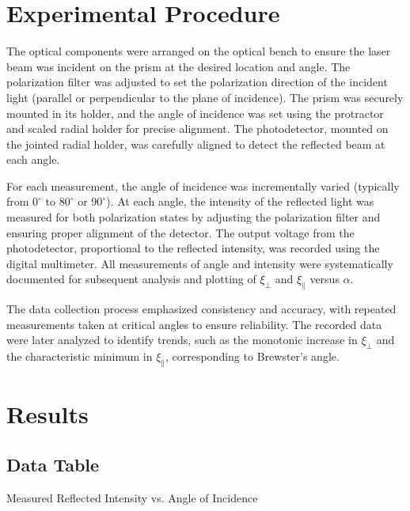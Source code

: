 \documentclass[journal]{IEEEtran}
\begin{document}
\section{Experimental Procedure}
The optical components were arranged on the optical bench to ensure the laser beam was incident on the prism at the desired location and angle. The polarization filter was adjusted to set the polarization direction of the incident light (parallel or perpendicular to the plane of incidence). The prism was securely mounted in its holder, and the angle of incidence was set using the protractor and scaled radial holder for precise alignment. The photodetector, mounted on the jointed radial holder, was carefully aligned to detect the reflected beam at each angle.

For each measurement, the angle of incidence was incrementally varied (typically from $0^\circ$ to $80^\circ$ or $90^\circ$). At each angle, the intensity of the reflected light was measured for both polarization states by adjusting the polarization filter and ensuring proper alignment of the detector. The output voltage from the photodetector, proportional to the reflected intensity, was recorded using the digital multimeter. All measurements of angle and intensity were systematically documented for subsequent analysis and plotting of $\xi_{\perp}$ and $\xi_{\parallel}$ versus $\alpha$.

The data collection process emphasized consistency and accuracy, with repeated measurements taken at critical angles to ensure reliability. The recorded data were later analyzed to identify trends, such as the monotonic increase in $\xi_{\perp}$ and the characteristic minimum in $\xi_{\parallel}$, corresponding to Brewster's angle.

\section{Results}
\subsection{Data Table}
\begin{table}[H]
    \centering
    \caption{Measured Reflected Intensity vs. Angle of Incidence}
    \label{tab:reflection_data}
\end{table}
\end{document}
